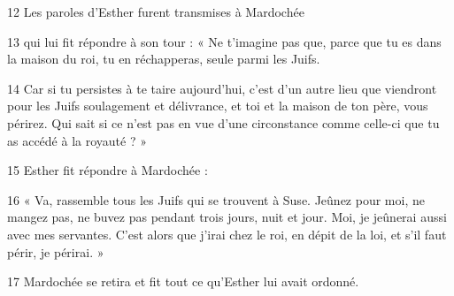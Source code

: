
12 Les paroles d’Esther furent transmises à Mardochée

13 qui lui fit répondre à son tour : « Ne t’imagine pas que, parce que tu es dans la maison du roi, tu en réchapperas, seule parmi les Juifs.

14 Car si tu persistes à te taire aujourd’hui, c’est d’un autre lieu que viendront pour les Juifs soulagement et délivrance, et toi et la maison de ton père, vous périrez. Qui sait si ce n’est pas en vue d’une circonstance comme celle-ci que tu as accédé à la royauté ? »

15 Esther fit répondre à Mardochée :

16 « Va, rassemble tous les Juifs qui se trouvent à Suse. Jeûnez pour moi, ne mangez pas, ne buvez pas pendant trois jours, nuit et jour. Moi, je jeûnerai aussi avec mes servantes. C’est alors que j’irai chez le roi, en dépit de la loi, et s’il faut périr, je périrai. »

17 Mardochée se retira et fit tout ce qu’Esther lui avait ordonné.
